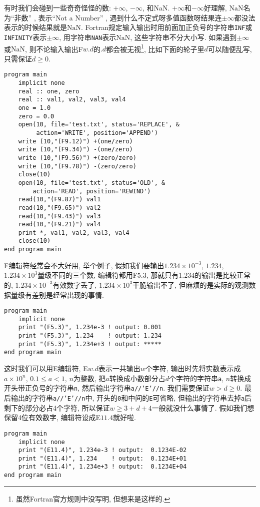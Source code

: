 有时我们会碰到一些奇奇怪怪的数: $+\infty$, $-\infty$, 和$\text{NaN}$. $+\infty$和$-\infty$好理解, $\text{NaN}$名为``非数'' , 表示``Not a Number'' , 遇到什么不定式呀多值函数呀结果连$\pm\infty$都没法表示的时候结果就是$\text{NaN}$. Fortran规定输入输出时用前面加正负号的字符串\texttt{INF}或\texttt{INFINITY}表示$\pm\infty$, 用字符串\texttt{NAN}表示$\text{NaN}$, 这些字符串不分大小写. 如果遇到$\pm\infty$或$\text{NaN}$, 则不论输入输出F$w.d$的$.d$都会被无视\footnote{虽然Fortran官方规则中没写明, 但想来是这样的.\label{edit_IEEE}}, 比如下面的轮子里$d$可以随便乱写, 只需保证$d\geqslant0$.
\begin{lstlisting}
program main
    implicit none
    real :: one, zero
    real :: val1, val2, val3, val4
    one = 1.0
    zero = 0.0
    open(10, file='test.txt', status='REPLACE', &
         action='WRITE', position='APPEND')
    write (10,"(F9.12)") +(one/zero)
    write (10,"(F9.34)") -(one/zero)
    write (10,"(F9.56)") +(zero/zero)
    write (10,"(F9.78)") -(zero/zero)
    close(10)
    open(10, file='test.txt', status='OLD', &
        action='READ', position='REWIND')
    read(10,"(F9.87)") val1
    read(10,"(F9.65)") val2
    read(10,"(F9.43)") val3
    read(10,"(F9.21)") val4
    print *, val1, val2, val3, val4
    close(10)
end program main
\end{lstlisting}

F编辑符经常会不大好用, 举个例子, 假如我们要输出$1.234\times10^{-3}$, $1.234$, $1.234\times10^{3}$量级不同的三个数, 编辑符都用F$5.3$, 那就只有$1.234$的输出是比较正常的, $1.234\times10^{-3}$有效数字丢了, $1.234\times10^{3}$干脆输出不了, 但麻烦的是实际的观测数据量级有差别是经常出现的事情.
\begin{lstlisting}
program main
    implicit none
    print "(F5.3)", 1.234e-3 ! output: 0.001
    print "(F5.3)", 1.234    ! output: 1.234
    print "(F5.3)", 1.234e+3 ! output: *****
end program main
\end{lstlisting}
这时我们可以用E编辑符, E$w.d$表示一共输出$w$个字符, 输出时先将实数表示成$a\times10^{n}$, $0.1\leqslant a<1$, $n$为整数, 把$a$转换成小数部分占$d$个字符的字符串\texttt{a}, $n$转换成开头带正负号的字符串\texttt{n}, 然后输出字符串\texttt{a//'E'//n}. 我们需要保证$w>d\geqslant0$. 最后输出的字符串\texttt{a//'E'//n}中, 开头的\texttt{0}和中间的\texttt{E}可省略, 但输出的字符串去掉\texttt{a}后剩下的部分必占4个字符, 所以保证$w\geqslant 3+d+4$一般就没什么事情了. 假如我们想保留4位有效数字, 编辑符设成E$11.4$就好啦.
\begin{lstlisting}
program main
    implicit none
    print "(E11.4)", 1.234e-3 ! output:  0.1234E-02
    print "(E11.4)", 1.234    ! output:  0.1234E+01
    print "(E11.4)", 1.234e+3 ! output:  0.1234E+04
end program main
\end{lstlisting}

